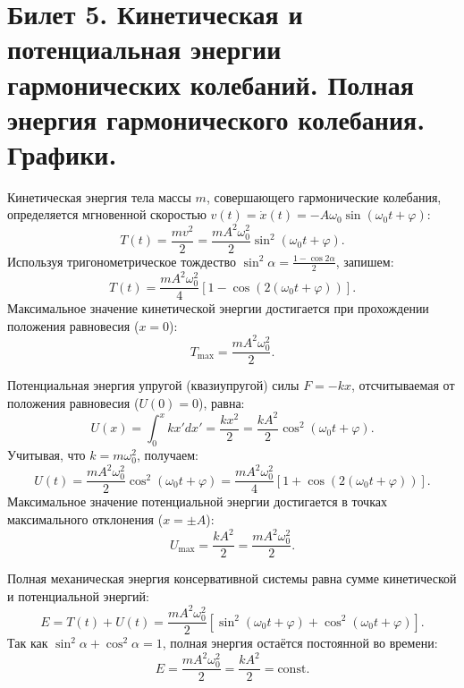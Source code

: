 \section{Билет 5. Кинетическая и потенциальная энергии гармонических колебаний. Полная энергия гармонического колебания. Графики.}

\begin{definition}
Кинетическая энергия тела массы $m$, совершающего гармонические колебания, определяется мгновенной скоростью $v(t) = \dot{x}(t) = -A\omega_0 \sin(\omega_0 t + \varphi)$:
\begin{equation}
    T(t) = \frac{m v^2}{2} = \frac{m A^2 \omega_0^2}{2} \sin^2(\omega_0 t + \varphi). \label{eq:kinetic_05}
\end{equation}
Используя тригонометрическое тождество $\sin^2\alpha = \frac{1-\cos 2\alpha}{2}$, запишем:
\begin{equation}
    T(t) = \frac{m A^2 \omega_0^2}{4} \left[1 - \cos(2(\omega_0 t + \varphi))\right].
\end{equation}
Максимальное значение кинетической энергии достигается при прохождении положения равновесия ($x=0$):
\begin{equation}
    T_{\max} = \frac{m A^2 \omega_0^2}{2}.
\end{equation}
\end{definition}

\begin{definition}
Потенциальная энергия упругой (квазиупругой) силы $F = -kx$, отсчитываемая от положения равновесия ($U(0)=0$), равна:
\begin{equation}
    U(x) = \int_0^x kx' dx' = \frac{k x^2}{2} = \frac{k A^2}{2} \cos^2(\omega_0 t + \varphi). \label{eq:potential_05}
\end{equation}
Учитывая, что $k = m \omega_0^2$, получаем:
\begin{equation}
    U(t) = \frac{m A^2 \omega_0^2}{2} \cos^2(\omega_0 t + \varphi) = \frac{m A^2 \omega_0^2}{4} \left[1 + \cos(2(\omega_0 t + \varphi))\right].
\end{equation}
Максимальное значение потенциальной энергии достигается в точках максимального отклонения ($x = \pm A$):
\begin{equation}
    U_{\max} = \frac{k A^2}{2} = \frac{m A^2 \omega_0^2}{2}.
\end{equation}
\end{definition}

\begin{theorem}
Полная механическая энергия консервативной системы равна сумме кинетической и потенциальной энергий:
\begin{equation}
    E = T(t) + U(t) = \frac{m A^2 \omega_0^2}{2} \left[\sin^2(\omega_0 t + \varphi) + \cos^2(\omega_0 t + \varphi)\right].
\end{equation}
Так как $\sin^2\alpha + \cos^2\alpha = 1$, полная энергия остаётся постоянной во времени:
\begin{equation}
    E = \frac{m A^2 \omega_0^2}{2} = \frac{k A^2}{2} = \text{const}. \label{eq:total_energy_05}
\end{equation}
\end{theorem}

